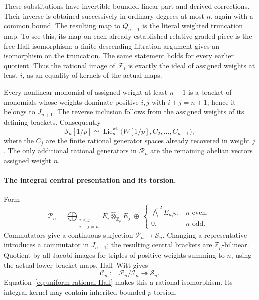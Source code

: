 \documentclass[11pt]{article}
\theoremstyle{definition}\newtheorem{definition}[theorem]{Definition}
\begin{document}
These substitutions have invertible bounded linear part and
derived corrections.  Their inverse is obtained successively
in ordinary degrees at most \(n\), again with a common bound.
The resulting map to \(Q_{n-1}\) is the literal weighted
truncation map.  To see this, its map on each already
established relative graded piece is the free Hall
isomorphism; a finite descending-filtration argument gives
an isomorphism on the truncation.  The same statement holds
for every earlier quotient.  Thus the rational image of
\(\mathcal F_i\) is exactly the ideal of assigned weights at least
\(i\), as an equality of kernels of the actual maps.

Every nonlinear monomial of assigned weight at least \(n+1\)
is a bracket of monomials whose weights dominate positive
\(i,j\) with \(i+j=n+1\); hence it belongs to \(J_{n+1}\).
The reverse inclusion follows from the assigned weights of
its defining brackets.  Consequently
\begin{equation}\label{eq:uniform-rational-Hall}
 \mathcal S_n[1/p]\simeq
 \operatorname{Lie}^{\mathrm{wt}}_n
      \bigl(W[1/p],C_2,\ldots,C_{n-1}\bigr),
\end{equation}
where the \(C_j\) are the finite rational generator spaces
already recovered in weight \(j\).
The only additional rational generators in \(\mathcal R_n\) are the
remaining abelian vectors assigned weight \(n\).

\paragraph{The integral central presentation and its torsion.}
Form
\[
 \mathcal P_n=
 \bigoplus_{\substack{i<j\\i+j=n}}
       E_i\widehat\otimes_{\mathbb Z_p} E_j
 \ \oplus\
 \begin{cases}
 \widehat{\bigwedge}^{\,2}E_{n/2},&n\text{ even},\\
 0,&n\text{ odd}.
 \end{cases}
\]
Commutators give a continuous surjection
\(\mathcal P_n\to \mathcal S_n\).  Changing a representative introduces
a commutator in \(J_{n+1}\); the resulting central brackets
are \(\mathbb Z_p\)-bilinear.  Quotient by all Jacobi images
for triples of positive weights summing to \(n\), using the
actual lower bracket maps.  Hall--Witt gives
\begin{equation}\label{eq:uniform-Hall-surjection}
       \mathcal C_n:=\mathcal P_n/\mathcal I_n
                         \twoheadrightarrow \mathcal S_n.
\end{equation}
Equation~\eqref{eq:uniform-rational-Hall} makes this a rational
isomorphism.  Its integral kernel may contain inherited
bounded \(p\)-torsion.
\end{document}
